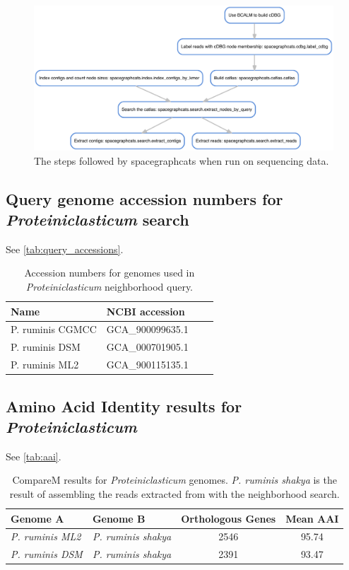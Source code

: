 \begin{figure}
 \centering
 \includegraphics[width=\linewidth]{sgc_dag}
	\caption{The steps followed by \textsf{spacegraphcats} when run
on sequencing data.
}
 \label{fig:sgc_dag}
\end{figure}

\subsection{Query genome accession numbers for {\em Proteiniclasticum} search}
\label{subsec:query_accessions}

See \autoref{tab:query_accessions}.

\begin{table}[b]
  \begin{tabular}{l l c c }
    \toprule
    Name & NCBI accession \\
    \midrule
    \hline
    P. ruminis CGMCC & GCA\_900099635.1 \\
    P. ruminis DSM & GCA\_000701905.1 \\
    P. ruminis ML2 & GCA\_900115135.1 \\
    \hline
    \bottomrule
  \end{tabular}
  \caption{Accession numbers for genomes used in {\em Proteiniclasticum} neighborhood query.}
  \label{tab:query_accessions}
\end{table}

\subsection{Amino Acid Identity results for {\em Proteiniclasticum}}
\label{subsec:aai}

See \autoref{tab:aai}.

\begin{table}
  \begin{tabular}{l l c c }
    \toprule
    Genome A & Genome B & Orthologous Genes & Mean AAI \\
    \midrule
    {\em P. ruminis ML2} & {\em P. ruminis shakya} & 2546 & 95.74 \\
    {\em P. ruminis DSM} & {\em P. ruminis shakya}  & 2391 & 93.47 \\
    \hline
    \bottomrule
  \end{tabular}
  \caption{CompareM results for {\em Proteiniclasticum} genomes. {\em P. ruminis shakya} is the result of assembling the reads extracted from \podarv with the neighborhood search.}
  \label{tab:aai}
\end{table}


